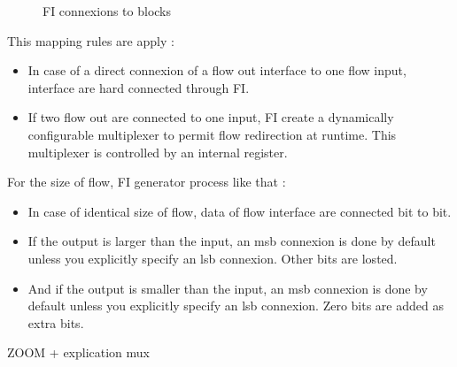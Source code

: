 \begin{figure}[h!]
\centering
{}
\caption{FI connexions to blocks}
\end{figure}

This mapping rules are apply :
\begin{itemize}
\item In case of a direct connexion of a flow out interface to one flow input, interface are hard connected through FI.
\item If two flow out are connected to one input, FI create a dynamically configurable multiplexer to permit flow redirection at runtime. This multiplexer is controlled by an internal register.
\end{itemize}

For the size of flow, FI generator process like that :
\begin{itemize}
\item In case of identical size of flow, data of flow interface are connected bit to bit.
\item If the output is larger than the input, an msb connexion is done by default unless you explicitly specify an lsb connexion. Other bits are losted.
\item And if the output is smaller than the input, an msb connexion is done by default unless you explicitly specify an lsb connexion. Zero bits are added as extra bits.
\end{itemize}

ZOOM + explication mux

